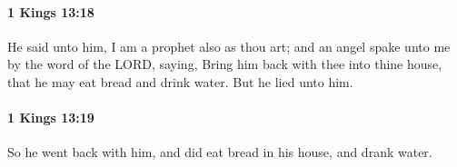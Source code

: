 		\paragraph{1 Kings 13:18} %
			\label{1KINGS-13-18}

			He said unto him, I am a prophet also as thou art; and an angel spake unto me by the word of the LORD, saying, Bring him back with thee into thine house, that he may eat bread and drink water. But he lied unto him.


		\paragraph{1 Kings 13:19} %
			\label{1KINGS-13-19}

			So he went back with him, and did eat bread in his house, and drank water.


